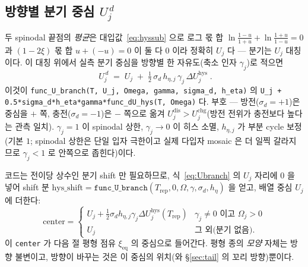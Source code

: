\documentclass[11pt,a4paper]{article}
\newcommand{\eq}{\mathrm{eq}}
\newcommand{\dis}{\mathrm{dis}}
\newcommand{\chg}{\mathrm{chg}}
\newcommand{\hys}{\mathrm{hys}}
\newcommand{\rep}{\mathrm{rep}}
\newcommand{\code}[1]{\texttt{#1}}
\begin{document}
\subsection{방향별 분기 중심 $U_j^{\,d}$}
두 spinodal 끝점의 \emph{평균}은 대입값~\eqref{eq:hyssub} 으로 로그 몫 합 $\ln\tfrac{1-u}{1+u}+\ln\tfrac{1+u}{1-u}=0$
과 $(1-2\xi)$ 몫 합 $u+(-u)=0$ 이 둘 다 $0$ 이라 정확히 $U_j$ 다 --- 분기는 $U_j$ 대칭이다. 이 대칭 위에서 실측 분기
중심을 방향별 한 자유도(축소 인자 $\gamma_j$)로 적으면
\begin{equation}
\boxed{\;U_j^{\,d}\;=\;U_j\;+\;\tfrac12\,\sigma_d\,h_{\eta,j}\,\gamma_j\,\Delta U_j^\hys\;.}
\label{eq:Ubranch}
\end{equation}
이것이 \code{func\_U\_branch(T, U\_j, Omega, gamma, sigma\_d, h\_eta)} 의
\code{U\_j + 0.5*sigma\_d*h\_eta*gamma*func\_dU\_hys(T, Omega)} 다. 부호 --- 방전($\sigma_d=+1$)은 중심을 $+$ 쪽,
충전($\sigma_d=-1$)은 $-$ 쪽으로 옮겨 $U_j^{\dis}>U_j^{\chg}$(방전 전위가 충전보다 높다는 관측 일치). $\gamma_j=1$ 이
spinodal 상한, $\gamma_j\to0$ 이 히스 소멸, $h_{\eta,j}$ 가 부분 cycle 보정(기본 $1$; spinodal 상한은 단일 입자 극한이고
실제 다입자 mosaic 은 더 일찍 갈라지므로 $\gamma_j<1$ 로 안쪽으로 좁힌다)이다.

코드는 전이당 상수인 분기 shift 만 필요하므로, 식~\eqref{eq:Ubranch} 의 $U_j$ 자리에 $0$ 을 넣어 shift 분
$\mathrm{hys\_shift}=\code{func\_U\_branch}(T_\rep,0,\Omega,\gamma,\sigma_d,h_\eta)$ 을 얻고, 배열 중심 $U_j$ 에 더한다:
\begin{equation}
\mathrm{center}=
\begin{cases}
U_j+\tfrac12\sigma_d h_{\eta,j}\gamma_j\Delta U_j^\hys(T_\rep) & \gamma_j\ne0 \text{ 이고 } \Omega_j>0\\[2pt]
U_j & \text{그 외(분기 없음)}.
\end{cases}
\label{eq:center}
\end{equation}
이 \code{center} 가 다음 절 평형 점유 $\xi_\eq$ 의 중심으로 들어간다. 평형 종의 \emph{모양} 자체는 방향 불변이고,
방향이 바꾸는 것은 이 중심의 위치(와 \S\ref{sec:tail} 의 꼬리 방향)뿐이다.
\end{document}
